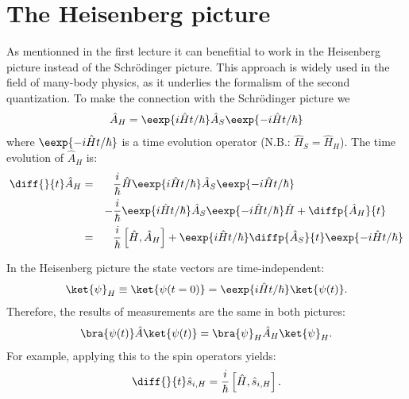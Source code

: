 \section{The Heisenberg picture}
As mentionned in the first lecture it can benefitial to work in the Heisenberg picture instead of the Schrödinger picture. This approach is widely used in the field of many-body physics, as it underlies the formalism of the second quantization. To make the connection with  the Schrödinger picture we 
\begin{align}
    \hat{A}_H=\eexp{i{\hat{H} t}/{\hbar}} \hat{A}_S \eexp{-i{\hat{H} t}/{\hbar}}
\end{align}
					where $\eexp{-i{\hat{H} t}/{\hbar}}$ is a time evolution operator (N.B.: $\hat{H}_S = \hat{H}_H$). The time evolution of $\hat{A}_H$ is:
					\begin{align}
						\notag \diff{}{t} \hat{A}_H &=&& \frac{i}{\hbar}\hat{H}\eexp{i{\hat{H}t}/{\hbar}}\hat{A}_S \eexp{-i{\hat{H} t}/{\hbar}}\\ 
						&&-&\frac{i}{\hbar} \eexp{i{\hat{H} t}/{\hbar}}\hat{A}_S \eexp{-i{\hat{H}t}/{\hbar}}\hat{H}+\diffp{\hat{A}_H}{t}\\
						&=&& \frac{i}{\hbar}\left[\hat{H},\hat{A}_H\right] + \eexp{i{\hat{H}t}/{\hbar}}\diffp{\hat{A}_S}{t}\eexp{-i{\hat{H}t}/{\hbar}}
					\end{align}

					In the Heisenberg picture the state vectors are time-in\-de\-pen\-dent:
					\begin{align}
						\ket{\psi}_H \equiv \ket{\psi(t=0)}=\eexp{i{\hat{H}}t/{\hbar}} \ket{\psi(t)}.
					\end{align}
					Therefore, the results of measurements are the same in both pictures:
					\begin{align}
						\bra{\psi(t)}\hat{A}\ket{\psi(t)} = \bra{\psi}_H \hat{A}_H \ket{\psi}_H.
					\end{align}
					For example, applying this to the spin operators yields:
					\begin{align}
						\diff{}{t}\hat{s}_{i,H}=\frac{i}{\hbar}\left[\hat{H},\hat{s}_{i,H}\right].
					\end{align}
